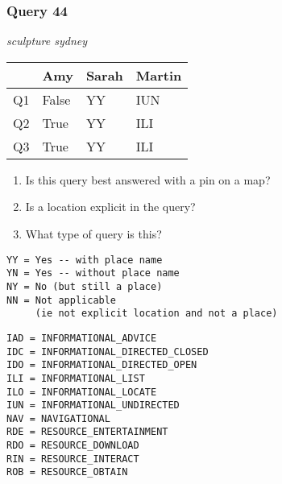 \begin{frame}[fragile]
\frametitle{Query 44}
\vspace{1em}

\emph{sculpture sydney}

\vfill

\begin{table}
  \centering
  \begin{tabular}{ l l l l }
    & \textbf{Amy} & \textbf{Sarah} & \textbf{Martin}\\
    \toprule
    Q1 & False & YY & IUN\\
Q2 & True & YY & ILI\\
Q3 & True & YY & ILI\\
    \bottomrule
  \end{tabular}
\end{table}

\vfill

\tiny{

\begin{enumerate}
\item Is this query best answered with a pin on a map?
\item Is a location explicit in the query?
\item What type of query is this?
\end{enumerate}

\vfill

\begin{multicols}{2}
\begin{verbatim}
YY = Yes -- with place name
YN = Yes -- without place name
NY = No (but still a place)
NN = Not applicable 
     (ie not explicit location and not a place)
\end{verbatim}

\columnbreak
\begin{verbatim}
IAD = INFORMATIONAL_ADVICE
IDC = INFORMATIONAL_DIRECTED_CLOSED
IDO = INFORMATIONAL_DIRECTED_OPEN
ILI = INFORMATIONAL_LIST
ILO = INFORMATIONAL_LOCATE
IUN = INFORMATIONAL_UNDIRECTED
NAV = NAVIGATIONAL
RDE = RESOURCE_ENTERTAINMENT
RDO = RESOURCE_DOWNLOAD
RIN = RESOURCE_INTERACT
ROB = RESOURCE_OBTAIN
\end{verbatim}
\end{multicols}
}

\end{frame}


